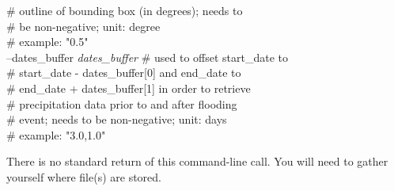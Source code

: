 \documentclass[10pt,a4paper,titlepage,parskip]{scrartcl}
\newenvironment{ttfont}{\fontfamily{\ttdefault}\selectfont}{\par}
\newcommand{\GRAU}[1]{\textcolor{ufzgray2}{#1}}
\begin{document}
\begin{framed}
\begin{ttfont}
\begin{tabbing}
			\> \> \GRAU{\# outline of bounding box (in degrees); needs to}\\
			\> \> \GRAU{\# be non-negative; unit: degree}\\
			\> \> \GRAU{\# example: "0.5"}\\
			\> --dates\_buffer \textit{dates\_buffer} \> \GRAU{\# used to offset start\_date to}\\
			\> \> \GRAU{\# start\_date - dates\_buffer[0] and end\_date to }\\
			\> \> \GRAU{\# end\_date + dates\_buffer[1] in order to retrieve}\\
			\> \> \GRAU{\# precipitation data prior to and after flooding}\\
			\> \> \GRAU{\# event; needs to be non-negative; unit: days}\\
			\> \> \GRAU{\# example: "3.0,1.0"}\\
		\end{tabbing}
	\end{ttfont}
	\vspace*{-0.3cm}
\end{framed}
\vspace*{-0.3cm}
There is no standard return of this command-line call. You will need to gather yourself where file(s) are stored.
\pagebreak
\end{document}
